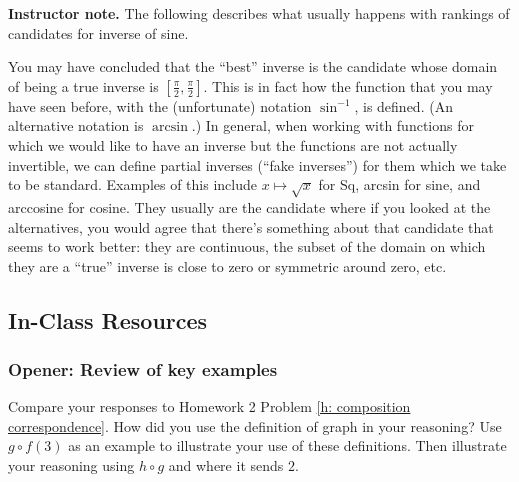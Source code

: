 \documentclass[11pt]{article}
\newcommand{\handout}{\subsubsection}
\newcommand\smallnote[1]
	{\begin{mdframed}\raggedright  {\bf Instructor note.} {#1} \end{mdframed}}
\theoremstyle{definition}
\begin{document}
\smallnote{The following describes what usually happens with rankings of candidates for inverse of sine.}

You may have concluded that the ``best'' inverse is the candidate whose domain of being a true inverse is $[\frac{\pi}{2}, \frac{\pi}{2}]$. This is in fact how the function that you may have seen before, with the (unfortunate) notation $\sin^{-1}$, is defined. (An alternative notation is $\arcsin$.) In general, when working with functions for which we would like to have an inverse but the functions are not actually invertible, we can define partial inverses (``fake inverses'') for them which we take to be standard. Examples of this include $x\mapsto \sqrt{x}$ for Sq, arcsin for sine, and arccosine for cosine. They usually are the candidate where if you looked at the alternatives, you would agree that there's something about that candidate that seems to work better: they are continuous, the subset of the domain on which they are a ``true'' inverse is close to zero or symmetric around zero, etc.


\newpage \subsection{In-Class Resources}  
\handout{Opener: Review of key examples}

Compare your responses to Homework 2 Problem \ref{h: composition correspondence}. How did you use the definition of graph in your reasoning? Use $g\circ f(3)$ as an example to illustrate your use of these definitions. Then illustrate your reasoning using $h\circ g$ and where it sends $2$.

\vspace*{-12pt}
\begin{center}
%
\end{center}
\end{document}
